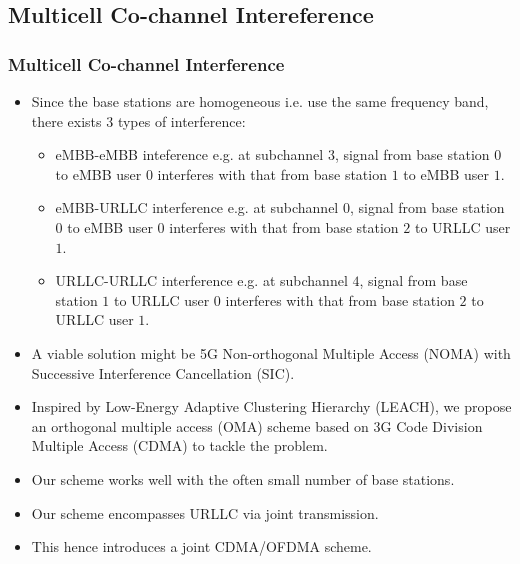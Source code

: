 \subsection{Multicell Co-channel Intereference}
\begin{frame}
  \frametitle{Multicell Co-channel Interference}
  \begin{itemize}
    \item Since the base stations are homogeneous i.e. use the same frequency band, there exists 3 types of interference:
      \begin{itemize}
        \item eMBB-eMBB inteference e.g. at subchannel $3$, signal from base station $0$ to eMBB user $0$ interferes with that from base station $1$ to eMBB user $1$.
        \item eMBB-URLLC interference e.g. at subchannel $0$, signal from base station $0$ to eMBB user $0$ interferes with that from base station $2$ to URLLC user $1$.
        \item URLLC-URLLC interference e.g. at subchannel $4$, signal from base station $1$ to URLLC user $0$ interferes with that from base station $2$ to URLLC user $1$.
      \end{itemize}
  \end{itemize}
\end{frame}

\begin{frame}
  \begin{itemize}
    \item A viable solution might be 5G Non-orthogonal Multiple Access (NOMA) with Successive Interference Cancellation (SIC). %
    \item Inspired by Low-Energy Adaptive Clustering Hierarchy (LEACH), we propose an orthogonal multiple access (OMA) scheme based on 3G Code Division Multiple Access (CDMA) to tackle the problem\exampleFootnote.
  \end{itemize}
\end{frame}

\begin{frame}
  \begin{itemize}
    \item Our scheme works well with the often small number of base stations.
    \item Our scheme encompasses URLLC  via joint transmission.
    \item This hence introduces a joint CDMA/OFDMA scheme.
  \end{itemize}
\end{frame}

